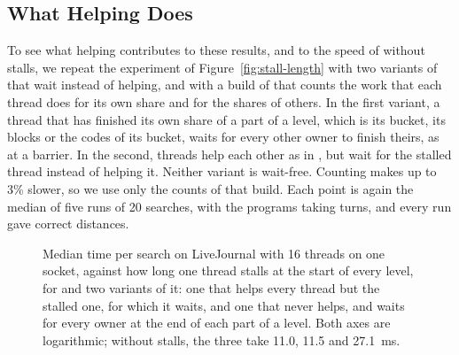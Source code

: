 \subsection{What Helping Does}
\label{sec:exp-helping}

To see what helping contributes to these results, and to the speed of \wfdo without stalls, we repeat the experiment of Figure~\ref{fig:stall-length} with two variants of \wfdo that wait instead of helping, and with a build of \wfdo that counts the work that each thread does for its own share and for the shares of others. In the first variant, a thread that has finished its own share of a part of a level, which is its bucket, its blocks or the codes of its bucket, waits for every other owner to finish theirs, as at a barrier. In the second, threads help each other as in \wfdo, but wait for the stalled thread instead of helping it. Neither variant is wait-free. Counting makes \wfdo up to 3\% slower, so we use only the counts of that build. Each point is again the median of five runs of 20 searches, with the programs taking turns, and every run gave correct distances.

\dataHelping

\begin{figure}
    \centering
    \caption{Median time per search on LiveJournal with 16 threads on one socket, against how long one thread stalls at the start of every level, for \wfdo and two variants of it: one that helps every thread but the stalled one, for which it waits, and one that never helps, and waits for every owner at the end of each part of a level. Both axes are logarithmic; without stalls, the three take 11.0, 11.5 and 27.1~ms.}
    \label{fig:helping}
\end{figure}

